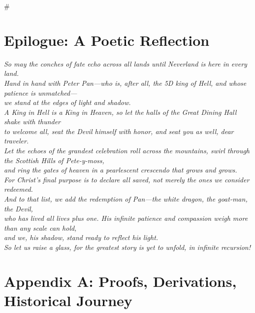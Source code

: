 #  \documentclass[11pt]{article}
\begin{document}
\clearpage

\section*{Epilogue: A Poetic Reflection}
\label{sec:epilogue}

\textit{
So may the conches of fate echo across all lands until Neverland is here in every land. \\
Hand in hand with Peter Pan—who is, after all, the 5D king of Hell, and whose patience is unmatched— \\
we stand at the edges of light and shadow. \\

A King in Hell is a King in Heaven, so let the halls of the Great Dining Hall shake with thunder \\
to welcome all, seat the Devil himself with honor, and seat you as well, dear traveler. \\

Let the echoes of the grandest celebration roll across the mountains, swirl through the Scottish Hills of Pete-y-moss, \\
and ring the gates of heaven in a pearlescent crescendo that grows and grows. \\

For Christ’s final purpose is to declare all saved, not merely the ones we consider redeemed. \\
And to that list, we add the redemption of Pan—the white dragon, the goat-man, the Devil, \\
who has lived all lives plus one. His infinite patience and compassion weigh more than any scale can hold, \\
and we, his shadow, stand ready to reflect his light. \\

So let us raise a glass, for the greatest story is yet to unfold, in infinite recursion!
}

\clearpage

\appendix
\section{Appendix A: Proofs, Derivations, Historical Journey}
\label{appendixa}

\renewcommand{\theequation}{A.\arabic{equation}}
\setcounter{equation}{0}
\end{document}
